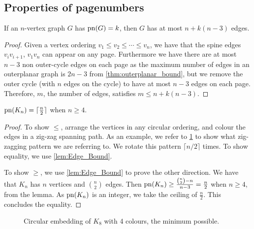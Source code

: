 \subsection{Properties of pagenumbers}\label{ssec:Related_Properties}
\begin{lemma}\label{lem:Edge_Bound}
	If an \(n\)-vertex graph \(G\) has \(\operatorname{pn}(G) = k\), then \(G\) has at most \(n + k(n-3)\) edges.
\end{lemma}
\begin{proof}
	Given a vertex ordering \(v_1 \leq v_2 \leq \cdots \leq v_n\), we have that the spine edges \(v_i v_{i + 1}\), \(v_1 v_n\)  can appear on any page. Furthermore we have there are at most \(n-3\) non outer-cycle edges on each page as the maximum number of edges in an outerplanar graph is \(2n - 3\) from \cref{thm:outerplanar_bound}, but we remove the outer cycle (with \(n\) edges on the cycle) to have at most \(n-3\) edges on each page. Therefore, \(m\), the number of edges, satisfies \(m \leq n + k (n - 3)\).
\end{proof}
\begin{theorem}\label{thm:Pagenumber_Complete_Graph}
	$\operatorname{pn}(K_n) = \lceil \frac{n}{2} \rceil$ when $n \geq 4$.
\end{theorem}
\begin{proof}
	To show $\leq$, arrange the vertices in any circular ordering, and colour the edges in a zig-zag spanning path. As an example, we refer to \cref{fig:k8 coloured with colours} to show what zig-zagging pattern we are referring to. We rotate this pattern $\lceil n/2 \rceil$ times. To show equality, we use \cref{lem:Edge_Bound}.
	\par
	To show $\geq$, we use \cref{lem:Edge_Bound} to prove the other direction. We have that \(K_n\) has \(n\) vertices and \(\binom{n}{2}\) edges. Then \(\operatorname{pn}(K_n) \geq \frac{\binom{n}{2} - n}{n - 3} = \frac{n}{2}\) when \(n \geq 4\), from the lemma. As \(\operatorname{pn}(K_n)\) is an integer, we take the ceiling of \(\frac{n}{2}\). This concludes the equality.
\end{proof}
\begin{figure}[ht]
	\caption{Circular embedding of \(K_8\) with 4 colours, the minimum possible.}
	\centering
	\label{fig:k8 coloured with colours}
\end{figure}

